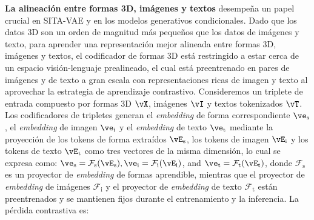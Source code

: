 \documentclass[../../book-main_es.tex]{subfiles}
\begin{document}

\textbf{La alineación entre formas 3D, imágenes y textos} desempeña un papel crucial
en SITA-VAE y en los modelos generativos condicionales. Dado que los datos 3D
son un orden de magnitud más pequeños que los datos de imágenes y texto, para aprender
una representación mejor alineada entre formas 3D, imágenes y textos,
el codificador de formas 3D está restringido a estar cerca de un espacio visión-lenguaje prealineado,
el cual está preentrenado en pares de imágenes y de texto a gran escala
con representaciones ricas de imagen y texto al aprovechar la
estrategia de aprendizaje contrastivo. Consideremos un triplete de entrada compuesto por formas 3D
$\vX$, imágenes $\vI$ y textos tokenizados $\vT$. Los codificadores de tripletes
generan el \textit{embedding} de forma correspondiente $\ve_{\mathrm{s}}$, el \textit{embedding} de imagen
$\ve_{\mathrm{i}}$ y el \textit{embedding} de texto $\ve_{\mathrm{t}}$ mediante la
proyección de los tokens de forma extraídos $\vE_{\mathrm{s}}$, los tokens de imagen
$\vE_{\mathrm{i}}$ y los tokens de texto $\vE_{\mathrm{t}}$ como tres
vectores de la misma dimensión, lo cual se expresa como:
$\ve_{\mathrm{s}} = \mathcal{F}_{\mathrm{s}}(\vE_{\mathrm{s}}),
\ve_{\mathrm{i}} = \mathcal{F}_{\mathrm{i}}(\vE_{\mathrm{i}})$, and
$\ve_{\mathrm{t}} = \mathcal{F}_{\mathrm{t}}(\vE_{\mathrm{t}})$,
donde $\mathcal{F}_{\mathrm{s}}$ es un proyector de \textit{embedding} de formas
aprendible, mientras que el proyector de \textit{embedding} de imágenes $\mathcal{F}_{\mathrm{i}}$ y
el proyector de \textit{embedding} de texto $\mathcal{F}_{\mathrm{t}}$ están preentrenados
y se mantienen fijos durante el entrenamiento y la inferencia. La pérdida contrastiva es:
\end{document}
